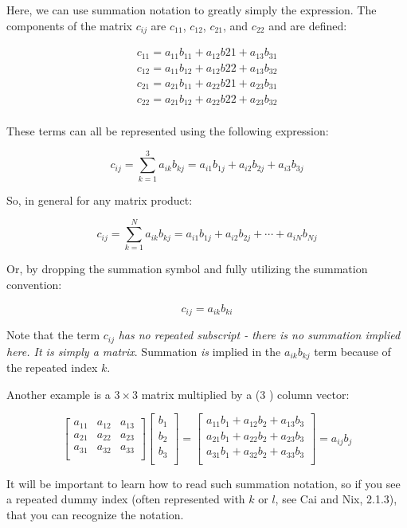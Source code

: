 Here, we can use summation notation to greatly simply the expression. The components of the matrix $c_{ij}$ are $c_{11}$, $c_{12}$, $c_{21}$, and $c_{22}$ and are defined:

\begin{align*}
	c_{11} = a_{11}b_{11} + a_{12}b{21} + a_{13}b_{31}\\
	c_{12} = a_{11}b_{12} + a_{12}b{22} + a_{13}b_{32}\\
	c_{21} = a_{21}b_{11} + a_{22}b{21} + a_{23}b_{31}\\
	c_{22} = a_{21}b_{12} + a_{22}b{22} + a_{23}b_{32}\\
\end{align*} 

These terms can all be represented using the following expression:

\begin{equation}
	c_{ij} = \sum_{k=1}^{3} a_{ik}b_{kj} = a_{i1}b_{1j} + a_{i2}b_{2j} + a_{i3}b_{3j}
\end{equation}

So, in general for any matrix product:

\begin{equation}
	c_{ij} = \sum_{k=1}^{N} a_{ik}b_{kj} = a_{i1}b_{1j} + a_{i2}b_{2j} + \cdots +  a_{iN}b_{Nj}
\end{equation}

Or, by dropping the summation symbol and fully utilizing the summation convention:

\begin{equation}
	c_{ij} = a_{ik}b_{ki}
\end{equation}

Note that the term $c_{ij}$ \emph{has no repeated subscript - there is no summation implied here. It is simply a matrix}. Summation \emph{is} implied in the $a_{ik}b_{kj}$ term because of the repeated index $k$.

Another example is a $3 \times 3$ matrix multiplied by a (3 ) column vector:

\begin{equation}
	\begin{bmatrix}
		a_{11} & a_{12} & a_{13}\\
		a_{21} & a_{22} & a_{23}\\
		a_{31} & a_{32} & a_{33}\\
	\end{bmatrix}
	\begin{bmatrix}
		b_1\\
		b_2\\
		b_3\\
	\end{bmatrix}
	=
	\begin{bmatrix}
		a_{11}b_{1} + a_{12}b_{2} + a_{13}b_{3} \\
		a_{21}b_{1} + a_{22}b_{2} + a_{23}b_{3}\\
		a_{31}b_{1} + a_{32}b_{2} + a_{33}b_{3}\\
	\end{bmatrix}
	= a_{ij}b_{j}
\end{equation}

It will be important to learn how to read such summation notation, so if you see a repeated dummy index (often represented with $k$ or $l$, see Cai and Nix, 2.1.3), that you can recognize the notation.
